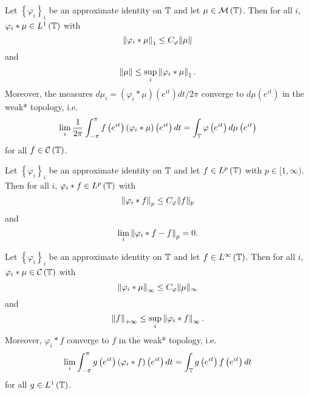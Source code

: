 \begin{theorem}
    Let $\left\{ \varphi _{i} \right\}_{i}$ be an approximate identity on $\mathbb T$ and let $\mu \in {\cal M} \left( \mathbb T \right)$. Then for all $i$, $\varphi_{i} * \mu  \in L^{1} \left( \mathbb T \right)$ with
    \begin{equation*}
	\left\lVert \varphi _{i} * \mu \right\rVert_{1} \le C_{\varphi} \lVert \mu \rVert
    \end{equation*}
    and
    \begin{equation*}
	\left\lVert \mu \right\rVert \le \sup_{i} \left\lVert \varphi_{i} * \mu \right\rVert_{1}\text{.}
    \end{equation*}
    Moreover, the measures $d\mu_{i} = \left( \varphi_{i} * \mu \right) \left( e^{it} \right) dt/2\pi$ converge to $d\mu \left( e^{it} \right)$ in the weak* topology, i.e.
    \begin{equation*}
	\lim_{i} \frac{1}{2\pi} \int_{-\pi}^{\pi} f\left( e^{it} \right) \left( \varphi_{i} * \mu \right) \left( e^{it} \right) dt = \int_{\mathbb T} \varphi\left( e^{it} \right) d\mu \left( e^{it} \right)
    \end{equation*}
    for all $f \in {\cal C} \left( \mathbb T \right)$.
    \label{thm:weak-star-measures}
\end{theorem}
\begin{theorem}
    Let $\left\{ \varphi _{i} \right\}_{i}$ be an approximate identity on $\mathbb T$ and let $f \in L^{p} \left( \mathbb T \right)$ with $p \in [1, \infty)$. Then for all $i$, $\varphi_{i} * f  \in L^{p} \left( \mathbb T \right)$ with
    \begin{equation*}
	\left\lVert \varphi _{i} * f \right\rVert_{p} \le C_{\varphi} \lVert f \rVert _{p}
    \end{equation*}
    and
    \begin{equation*}
	\lim_{i} \left\lVert \varphi_{i} * f -f \right\rVert_{p} = 0 \text{.}
	    \end{equation*} 
    \label{thm:convergence-in-Lp}
\end{theorem}


\begin{theorem}
    Let $\left\{ \varphi _{i} \right\}_{i}$ be an approximate identity on $\mathbb T$ and let $f\in L^{\infty} \left( \mathbb T \right)$. Then for all $i$, $\varphi_{i} * \mu  \in {\cal C} \left( \mathbb T \right)$ with
    \begin{equation*}
	\left\lVert \varphi _{i} * \mu \right\rVert_{\infty} \le C_{\varphi} \lVert \mu \rVert _{\infty}
    \end{equation*}
    and
    \begin{equation*}
	\left\lVert f \right\rVert_{+\infty} \le \sup_{i} \left\lVert \varphi_{i} * f \right\rVert_{\infty}\text{.}
    \end{equation*}
    Moreover, $\varphi_{i} * f$ converge to $f$ in the weak* topology, i.e.
    \begin{equation*}
    \lim_{i} \int_{-\pi}^{\pi} g\left( e^{it} \right) \left( \varphi_{i} * f \right) \left( e^{it} \right) dt = \int_{\mathbb T} g\left( e^{it} \right) f \left( e^{it} \right) dt 
    \end{equation*}
    for all $g \in L^{1} \left( \mathbb T \right)$.
    \label{thm:weak-star-infinity}
\end{theorem}

